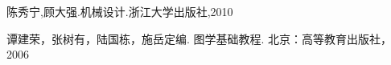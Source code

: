 \begin{thebibliography}{0}

陈秀宁,顾大强.机械设计.浙江大学出版社,2010

谭建荣，张树有，陆国栋，施岳定编. 图学基础教程. 北京：高等教育出版社，2006
\end{thebibliography}
